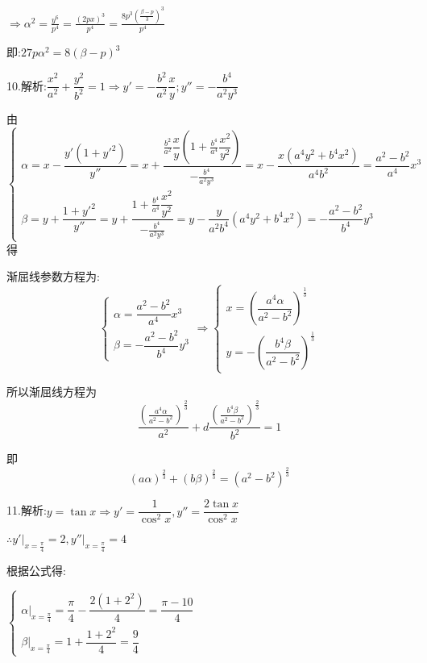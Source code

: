 $ \Rightarrow {\alpha ^2} = \frac{{{y^6}}}{{{p^4}}} = \frac{{{{(2px)}^3}}}{{{p^4}}} = \frac{{8{p^3}{{(\frac{{\beta  - p}}{3})}^3}}}{{{p^4}}}$

即:$27p{\alpha ^2} = 8{(\beta  - p)^3}$

10.解析:$\dfrac{{{x^2}}}{{{a^2}}} + \dfrac{{{y^2}}}{{{b^2}}} = 1 \Rightarrow y' =  - \dfrac{{{b^2}}}{{{a^2}}}\dfrac{x}{y};y'' =  - \dfrac{{{b^4}}}{{{a^2}{y^3}}}$

由$\left\{ \begin{array}{l}
\alpha  = x - \dfrac{{y'(1 + {{y'}^2})}}{{y''}} = x + \dfrac{{\frac{{{b^2}}}{{{a^2}}}\dfrac{x}{y}(1 + \frac{{{b^4}}}{{{a^4}}}\dfrac{{{x^2}}}{{{y^2}}})}}{{ - \frac{{{b^4}}}{{{a^2}{y^3}}}}} = x - \dfrac{{x({a^4}{y^2} + {b^4}{x^2})}}{{{a^4}{b^2}}} = \dfrac{{{a^2} - {b^2}}}{{{a^4}}}{x^3}\\
\beta  = y + \dfrac{{1 + {{y'}^2}}}{{y''}} = y + \dfrac{{1 + \frac{{{b^4}}}{{{a^4}}}\dfrac{{{x^2}}}{{{y^2}}}}}{{ - \frac{{{b^4}}}{{{a^2}{y^3}}}}} = y - \dfrac{y}{{{a^2}{b^4}}}({a^4}y{}^2 + {b^4}{x^2}) =  - \dfrac{{{a^2} - {b^2}}}{{{b^4}}}{y^3}
\end{array} \right.$得

渐屈线参数方程为:\[\left\{ \begin{array}{l}
\alpha  = \dfrac{{{a^2} - {b^2}}}{{{a^4}}}{x^3}\\
\beta  =  - \dfrac{{{a^2} - {b^2}}}{{{b^4}}}{y^3}
\end{array} \right. \Rightarrow \left\{ \begin{array}{l}
x = {(\dfrac{{{a^4}\alpha }}{{{a^2} - {b^2}}})^{\frac{1}{3}}}\\
y =  - {(\dfrac{{{b^4}\beta }}{{{a^2} - {b^2}}})^{\frac{1}{3}}}
\end{array} \right.\]

所以渐屈线方程为\[\dfrac{{{{(\frac{{{a^4}\alpha }}{{{a^2} - {b^2}}})}^{\frac{2}{3}}}}}{{{a^2}}} + d\frac{{{{(\frac{{{b^4}\beta }}{{{a^2} - {b^2}}})}^{\frac{2}{3}}}}}{{{b^2}}} = 1\]

即\[{(a\alpha )^{\frac{2}{3}}} + {(b\beta )^{\frac{2}{3}}} = {({a^2} - {b^2})^{\frac{2}{3}}}\]

11.解析:$y = \tan x \Rightarrow y' = \dfrac{1}{{{{\cos }^2}x}},y'' = \dfrac{{2\tan x}}{{{{\cos }^2}x}}$

$\therefore y'{|_{x = \frac{\pi }{4}}} = 2,y''{|_{x = \frac{\pi }{4}}} = 4$

根据公式得:

$\left\{ \begin{array}{l}
\alpha {|_{x = \frac{\pi }{4}}} = \dfrac{\pi }{4} - \dfrac{{2(1 + {2^2})}}{4} = \dfrac{{\pi  - 10}}{4}\\
\beta {|_{x = \frac{\pi }{4}}} = 1 + \dfrac{{1 + {2^2}}}{4} = \dfrac{9}{4}
\end{array} \right.$


